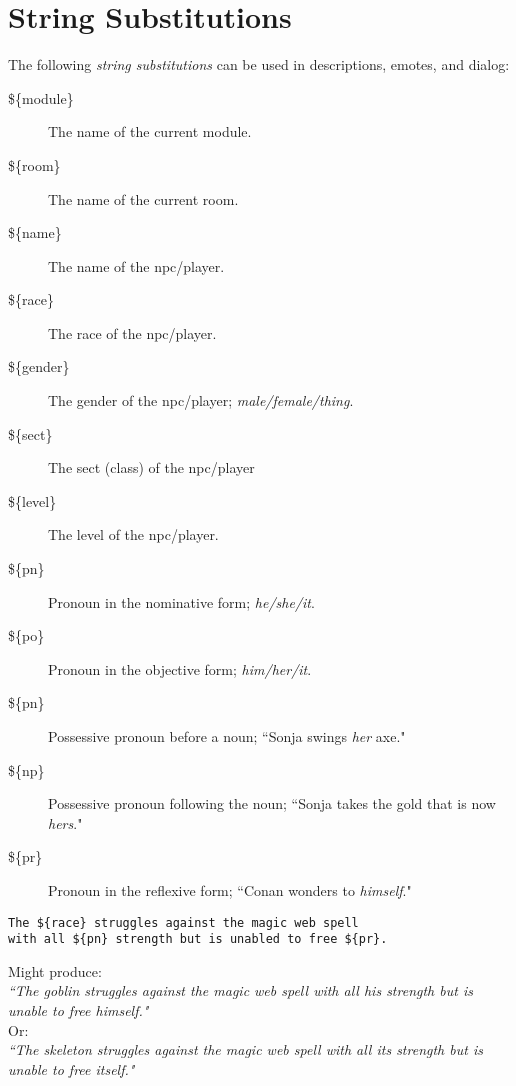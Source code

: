 
\section{String Substitutions}

The following \emph{string substitutions} can be used in descriptions, 
emotes, and dialog:

\begin{description}
    \item[ \$\{module\} ] The name of the current module. 
    \item[ \$\{room\} ] The name of the current room.
    \item[ \$\{name\} ] The name of the npc/player.
    \item[ \$\{race\} ] The race of the npc/player.
    \item[ \$\{gender\} ] The gender of the npc/player; 
        \emph{male/female/thing}.
    \item[ \$\{sect\} ] The sect (class) of the npc/player
    \item[ \$\{level\} ] The level of the npc/player.
    \item[ \$\{pn\} ] Pronoun in the nominative form; \emph{he/she/it}.
    \item[ \$\{po\} ] Pronoun in the objective form; \emph{him/her/it}.
    \item[ \$\{pn\} ] Possessive pronoun before a noun; 
        ``Sonja swings \emph{her} axe."
    \item[ \$\{np\} ] Possessive pronoun following the noun;
        ``Sonja takes the gold that is now \emph{hers}."
    \item[ \$\{pr\} ] Pronoun in the reflexive form; 
        ``Conan wonders to \emph{himself}." 

\end{description}


\begin{lstlisting}[caption=String Sub Example]
The ${race} struggles against the magic web spell
with all ${pn} strength but is unabled to free ${pr}.
\end{lstlisting}
    

Might produce:\\

\emph{``The goblin struggles against the magic web spell
with all his strength but is unable to free himself."}\\

Or:\\

\emph{``The skeleton struggles against the magic web spell
with all its strength but is unable to free itself."}\\

